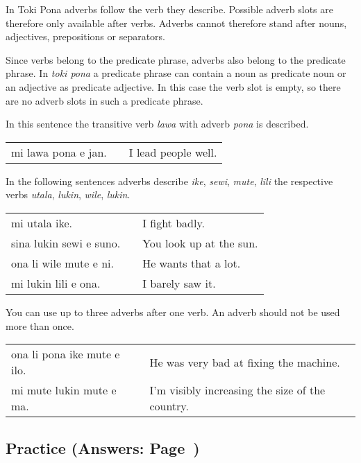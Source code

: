 In Toki Pona adverbs follow the verb they describe. 
Possible adverb slots are therefore only available after verbs.
Adverbs cannot therefore stand after nouns, adjectives, prepositions or separators. 

Since verbs belong to the predicate phrase, adverbs also belong to the predicate phrase.
In \textit{toki pona} a predicate phrase can contain a noun as predicate noun or an adjective as predicate adjective. 
In this case the verb slot is empty, so there are no adverb slots in such a predicate phrase. 

In this sentence the transitive verb \textit{lawa} with adverb \textit{pona} is described. 

\begin{supertabular}{p{5,5cm}|ll}
mi lawa pona e jan. && I lead people well. \\
\end{supertabular} 

In the following sentences adverbs describe \textit{ike}, \textit{sewi}, \textit{mute}, \textit{lili} the respective verbs \textit{utala}, \textit{lukin}, \textit{wile}, \textit{lukin}.

\begin{supertabular}{p{5,5cm}|ll}
mi utala ike. && I fight badly. \\
sina lukin sewi e suno. && You look up at the sun. \\
ona li wile mute e ni. && He wants that a lot. \\
mi lukin lili e ona. && I barely saw it. \\
\end{supertabular} 

You can use up to three adverbs after one verb. 
An adverb should not be used more than once. 

\begin{supertabular}{p{5,5cm}|ll}
ona li pona ike mute e ilo. && He was very bad at fixing the machine. \\
mi mute lukin mute e ma. && I'm visibly increasing the size of the country. \\
\end{supertabular}

%
\newpage
\subsection*{Practice (Answers: Page~\pageref{'adverbs'})}

